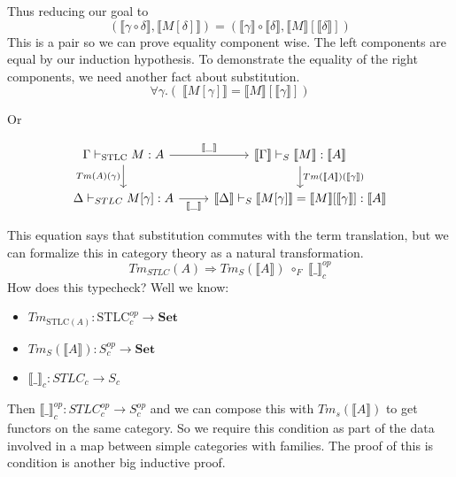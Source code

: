 \documentclass[12pt]{article}
\theoremstyle{definition}
\newcommand{\den}[1]{\llbracket #1 \rrbracket}
\begin{document}
Thus reducing our goal to 
\[
    (\den{\gamma\circ \delta}, \den{M[\delta]}) = (\den{\gamma} \circ \den{\delta}, \den{M}[\den{\delta}]) 
\]
This is a pair so we can prove equality component wise. The left components are equal by our induction hypothesis. To demonstrate the equality of the right components, we need another fact about substitution. 
\[
 \forall \gamma. (\; \den{M[\gamma]} = \den{M}[\den{\gamma}] )
\]

Or


\[
    \begin{tikzcd}
        \Gamma \vdash_{\textrm{STLC}} M : A  \arrow[r, "\den{\_}"] \arrow[d, "Tm(A)(\gamma)"'] & \den{\Gamma} \vdash_S \den{M} : \den{A} \arrow[d, "Tm(\den{A})(\den{\gamma})"] \\
        \Delta \vdash_{STLC} M[\gamma] : A \arrow[r, "\den{\_}"'] & \den{\Delta} \vdash_S \den{M[\gamma]}= \den{M}[\den{\gamma}] : \den{A}
        \end{tikzcd}
\]


This equation says that substitution commutes with the term translation, but we can formalize this in category theory as a natural transformation.
\[
  Tm_{STLC}(A)  \Rightarrow Tm_S(\den{A}) \;\circ_F\; \den{\_}_c^{op} 
\]
How does this typecheck? Well we know:
\begin{itemize}
    \item $Tm_{\textrm{STLC}(A)} : \textrm{STLC}_c^{op} \to \mathbf{Set}$
    \item  $Tm_S(\den{A}) : S_c ^{op} \to \mathbf{Set}$
    \item $\den{\_}_c : STLC_c \to S_c$
\end{itemize}

Then $\den{\_}_c ^{op} : STLC_c^{op} \to S_c^{op}$ and we can compose this with $Tm_s(\den{A})$ to get functors on the same category. So we require this condition as part of the data involved in a map between simple categories with families. The proof of this is condition is another big inductive proof.
\end{document}
